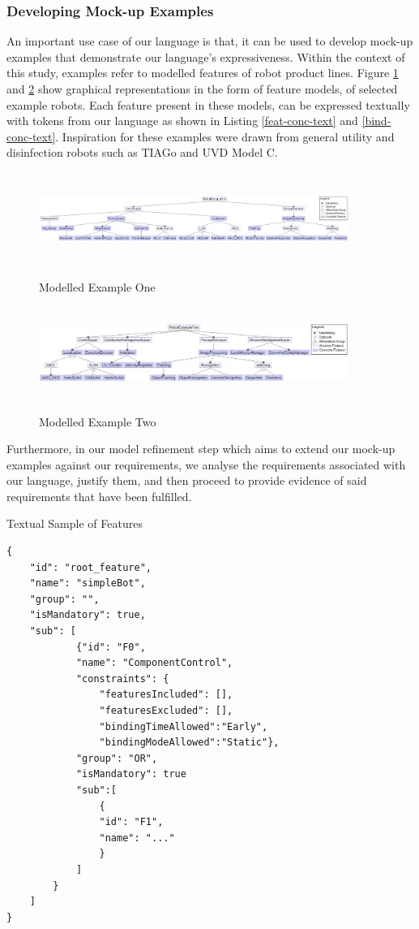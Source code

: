 \documentclass[conference]{IEEEtran}
\begin{document}
\subsubsection{Developing Mock-up Examples}
An important use case of our language is that, it can be used to develop mock-up examples that demonstrate our language's expressiveness. Within the context of this study, examples refer to modelled features of robot product lines. Figure \ref{ex1} and \ref{ex2} show graphical representations in the form of feature models, of selected example robots. Each feature present in these models, can be expressed textually with tokens from our language as shown in Listing \ref{feat-conc-text} and \ref{bind-conc-text}. Inspiration for these examples were drawn from general utility and disinfection robots such as TIAGo and UVD Model C.
    
\begin{figure}[h]
\caption{Modelled Example One}
\centering
\includegraphics[width=0.9\textwidth,height=3cm]{diagrams/ex1.png}
\label{ex1}
\end{figure}

\begin{figure}[h]
\caption{Modelled Example Two}
\centering
\includegraphics[width=0.9\textwidth,height=3cm]{diagrams/ex2.png}
\label{ex2}
\end{figure}
    
Furthermore, in our model refinement step which aims to extend our mock-up examples against our requirements, we analyse the requirements associated with our language, justify them, and then proceed to provide evidence of said requirements that have been fulfilled.

\begin{listing}[H]
\caption{Textual Sample of Features}
\begin{verbatim}
{
    "id": "root_feature",
    "name": "simpleBot",
    "group": "",
    "isMandatory": true,
    "sub": [
	        {"id": "F0",
	        "name": "ComponentControl",
	        "constraints": {
		        "featuresIncluded": [],
		        "featuresExcluded": [],
		        "bindingTimeAllowed":"Early",
		        "bindingModeAllowed":"Static"},
	        "group": "OR",
	        "isMandatory": true
	        "sub":[
	            {
	            "id": "F1",
	            "name": "..."
	            }
	        ]
        }
    ]
}
\end{verbatim}
\label{feat-conc-text}
\end{listing}
\end{document}
